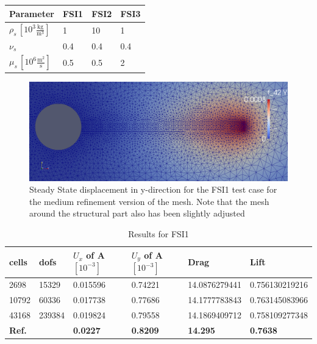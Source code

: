 \begin{table}[!h]
\begin{center}
  \begin{tabular}{|l | l | l | l|} \hline
	Parameter & FSI1 & FSI2 & FSI3 \\ \hline
    $\rho_s \,[10^3\frac{\text{kg}}{\text{m}^3}]$  & 1 & 10 & 1 \\   \hline
    $\nu_s $ & 0.4 & 0.4 & 0.4 \\ \hline
    $\mu_s \,[10^{6}\frac{\text{m}^2}{\text{s}}]$ & 0.5 & 0.5 & 2   \\ \hline \hline
  \end{tabular}
\end{center}
\end{table}
\begin{center}
\begin{figure}[!h]
\includegraphics[width=\linewidth]{figures/FSI1_mesh_med}
\caption{Steady State displacement in y-direction for the FSI1 test case for the medium refinement version of the mesh. Note that the mesh around the structural part also has been slightly adjusted}
\end{figure}
\end{center}


\begin{table}[!h]
\begin{center}
  \begin{tabular}{|l | l | l | l | l | l|} \hline
	cells & dofs & $U_x$ of A $[10^{-3}]$ & $U_y$ of A $[10^{-3}]$ & Drag & Lift\\ \hline
    2698 & 15329 & 0.015596 & 0.74221 & 14.0876279441 & 0.756130219216 \\   \hline
    10792 & 60336 & 0.017738 & 0.77686 & 14.1777783843 & 0.763145083966 \\ \hline
    43168 & 239384 & 0.019824 & 0.79558  & 14.1869409712 & 0.758109277348  \\ \hline \hline
    \textbf{Ref.}  & & \textbf{0.0227} & \textbf{0.8209} & \textbf{14.295} & \textbf{0.7638}\\ \hline 
    \hline
  \end{tabular}	
\caption{Results for FSI1}
\end{center}
\end{table}

